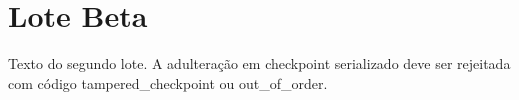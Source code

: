 \section{Lote Beta}
Texto do segundo lote. A adulteração em checkpoint serializado deve ser rejeitada com código tampered_checkpoint ou out_of_order.
